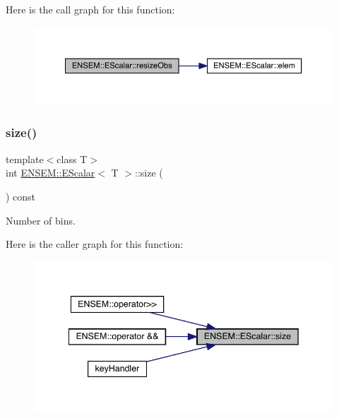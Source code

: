 Here is the call graph for this function\+:
\nopagebreak
\begin{figure}[H]
\begin{center}
\leavevmode
\includegraphics[width=350pt]{d0/d82/classENSEM_1_1EScalar_a9273a529024099effecf6962eafa044e_cgraph}
\end{center}
\end{figure}
\mbox{\label{classENSEM_1_1EScalar_a314f162d71b15a8eb7e3382a274aa12b}} 
\subsubsection{\texorpdfstring{size()}{size()}\hspace{0.1cm}{\footnotesize\ttfamily [1/3]}}
{\footnotesize\ttfamily template$<$class T$>$ \\
int \mbox{\hyperlink{classENSEM_1_1EScalar}{E\+N\+S\+E\+M\+::\+E\+Scalar}}$<$ T $>$\+::size (\begin{DoxyParamCaption}{ }\end{DoxyParamCaption}) const\hspace{0.3cm}{\ttfamily [inline]}}



Number of bins. 

Here is the caller graph for this function\+:
\nopagebreak
\begin{figure}[H]
\begin{center}
\leavevmode
\includegraphics[width=342pt]{d0/d82/classENSEM_1_1EScalar_a314f162d71b15a8eb7e3382a274aa12b_icgraph}
\end{center}
\end{figure}
\mbox{\label{classENSEM_1_1EScalar_a314f162d71b15a8eb7e3382a274aa12b}} 

